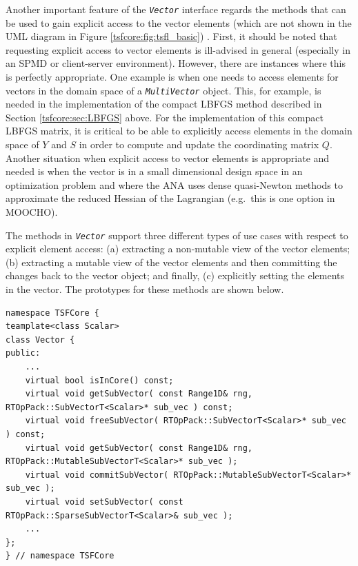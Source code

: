 Another important feature of the \texttt{\textit{Vector}} interface
regards the methods that can be used to gain explicit access to the
vector elements (which are not shown in the UML diagram in Figure
\ref{tsfcore:fig:tsfl_basic}) .  First, it should be noted that requesting
explicit access to vector elements is ill-advised in general
(especially in an SPMD or client-server environment).  However, there
are instances where this is perfectly appropriate.  One example is
when one needs to access elements for vectors in the domain space of a
\texttt{\textit{Multi\-Vector}} object.  This, for example, is needed in the
implementation of the compact LBFGS method described in Section
\ref{tsfcore:sec:LBFGS} above.  For the implementation of this compact
LBFGS matrix, it is critical to be able to explicitly access elements
in the domain space of $Y$ and $S$ in order to compute and update the
coordinating matrix $Q$.  Another situation when explicit access to
vector elements is appropriate and needed is when the vector is in a
small dimensional design space in an optimization problem and where
the ANA uses dense quasi-Newton methods to approximate the reduced
Hessian of the Lagrangian (e.g.~this is one option in MOOCHO).

The methods in \texttt{\textit{Vector}} support three different types
of use cases with respect to explicit element access: (a) extracting a
non-mutable view of the vector elements; (b) extracting a mutable view
of the vector elements and then committing the changes back to the
vector object; and finally, (c) explicitly setting the elements in the
vector.  The prototypes for these methods are shown below.

{\scriptsize\begin{verbatim}
namespace TSFCore {
teamplate<class Scalar>
class Vector {
public:
    ...
    virtual bool isInCore() const;
    virtual void getSubVector( const Range1D& rng, RTOpPack::SubVectorT<Scalar>* sub_vec ) const;
    virtual void freeSubVector( RTOpPack::SubVectorT<Scalar>* sub_vec ) const;
    virtual void getSubVector( const Range1D& rng, RTOpPack::MutableSubVectorT<Scalar>* sub_vec );
    virtual void commitSubVector( RTOpPack::MutableSubVectorT<Scalar>* sub_vec );
    virtual void setSubVector( const RTOpPack::SparseSubVectorT<Scalar>& sub_vec );
    ...
};
} // namespace TSFCore
\end{verbatim}}

